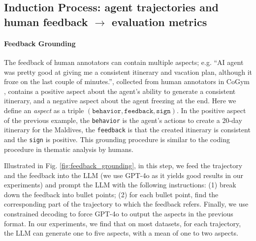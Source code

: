 

\subsection{Induction Process: agent trajectories and human feedback $\rightarrow$ evaluation metrics}
\label{sec:induction_process}

\paragraph{Feedback Grounding}
The feedback of human annotators can contain multiple aspects; e.g. \textsf{``AI agent was pretty good
at giving me a consistent itinerary and vacation plan, although it froze on the last couple of minutes.''},
collected from human annotators in CoGym \citep{shao2024collaborative}, contains a positive aspect
about the agent's ability to generate a consistent itinerary, and a negative aspect about the agent freezing
at the end. Here we define an \emph{aspect} as a triple $(\texttt{behavior}, \texttt{feedback}, \texttt{sign})$.
In the positive aspect of the previous example, the \texttt{behavior} is the agent's actions to create
a 20-day itinerary for the Maldives, the \texttt{feedback} is that the created itinerary is consistent and the \texttt{sign} is positive. This grounding procedure is similar to the coding procedure in thematic analysis by humans.



Illustrated in Fig. \ref{fig:feedback_grounding}, in this step, we feed the trajectory and the feedback into the LLM (we use GPT-4o \citep{openai2024gpt4ocard} 
as it yields good results in our experiments) and prompt the LLM with the following instructions:
(1) break down the feedback into bullet points; (2) for each bullet point, find the corresponding
part of the trajectory to which the feedback refers. Finally, we use constrained decoding to force GPT-4o
to output the aspects in the previous format. In our experiments, we find that on most datasets, for each
trajectory, the LLM can generate one to five aspects, with a mean of one to two aspects.


